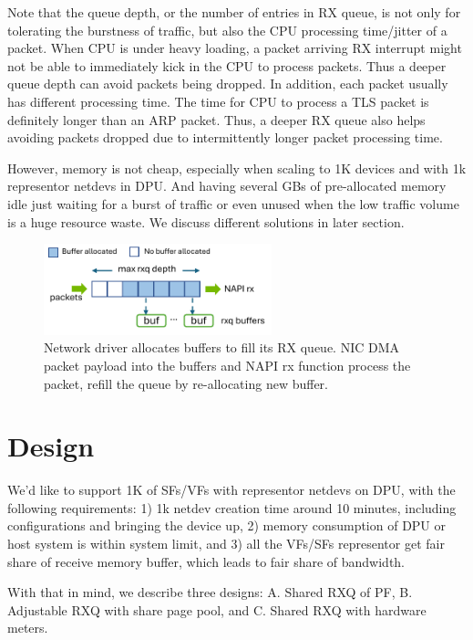 \documentclass[letterpaper]{article}
\begin{document}
Note that the queue depth, or the number of entries in RX queue, is
not only for tolerating the burstness of traffic, but also the CPU
processing time/jitter of a packet. When CPU is under heavy loading,
a packet arriving RX interrupt might not be able to immediately
kick in the CPU to process packets. Thus a deeper queue depth can
avoid packets being dropped.
In addition, each packet usually has different processing time.
The time for CPU to process a TLS packet is definitely longer than
an ARP packet. Thus, a deeper RX queue also helps avoiding packets
dropped due to intermittently longer packet processing time.

However, memory is not cheap, especially when scaling to 1K devices
and with 1k representor netdevs in DPU. And having several GBs of
pre-allocated memory idle just waiting for a burst of traffic
or even unused when the low traffic volume is a huge resource waste.
We discuss different solutions in later section.

\begin{figure}[h]
\includegraphics[width=2.6in]{rxq.pdf}
\centering
\caption{Network driver allocates buffers to fill its RX queue. NIC DMA packet
payload into the buffers and NAPI rx function process the packet, refill the 
queue by re-allocating new buffer.}
\label{fig:rxq}
\end{figure}

\section{Design}
We'd like to support 1K of SFs/VFs with representor netdevs
on DPU, with the following requirements: 1) 1k netdev creation time
around 10 minutes, including configurations and bringing the device up,
2) memory consumption of DPU or host system is within
system limit, and 3) all the VFs/SFs representor get fair share
of receive memory buffer, which leads to fair share of bandwidth.

With that in mind, we describe three designs: A. Shared RXQ of PF,
B. Adjustable RXQ with share page pool, and C. Shared RXQ with hardware meters.

\end{document}
